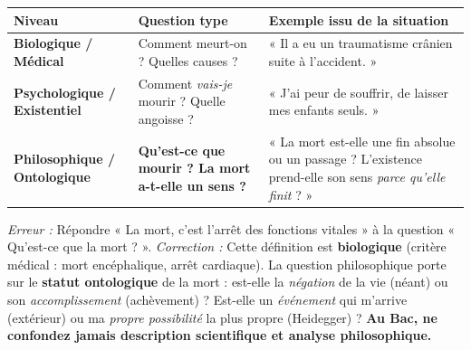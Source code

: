 \documentclass[11pt]{article}
\begin{document}
\begin{center}
\begin{tabularx}{\linewidth}{|l|X|X|}\hline
\textbf{Niveau} & \textbf{Question type} & \textbf{Exemple issu de la situation} \\ \hline
\textbf{Biologique / Médical} & Comment meurt-on ? Quelles causes ? & « Il a eu un traumatisme crânien suite à l'accident. » \\ \hline
\textbf{Psychologique / Existentiel} & Comment \emph{vais-je} mourir ? Quelle angoisse ? & « J'ai peur de souffrir, de laisser mes enfants seuls. » \\ \hline
\textbf{Philosophique / Ontologique} & \textbf{Qu'est-ce que mourir ? La mort a-t-elle un sens ?} & « La mort est-elle une fin absolue ou un passage ? L'existence prend-elle son sens \emph{parce qu'elle finit} ? » \\ \hline
\end{tabularx}
\end{center}

\begin{attention}
\emph{Erreur :} Répondre « La mort, c'est l'arrêt des fonctions vitales » à la question « Qu'est-ce que la mort ? ».
\emph{Correction :} Cette définition est \textbf{biologique} (critère médical : mort encéphalique, arrêt cardiaque). La question philosophique porte sur le \textbf{statut ontologique} de la mort : est-elle la \emph{négation} de la vie (néant) ou son \emph{accomplissement} (achèvement) ? Est-elle un \emph{événement} qui m'arrive (extérieur) ou ma \emph{propre possibilité} la plus propre (Heidegger) ? \textbf{Au Bac, ne confondez jamais description scientifique et analyse philosophique.}
\end{attention}
\end{document}
